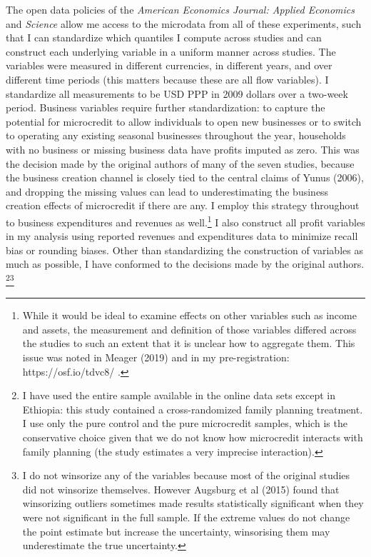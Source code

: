 \documentclass[english,12pt]{article}\usepackage{lmodern}
\numberwithin{equation}{section}
\begin{document}

The open data policies of the \emph{American Economics Journal: Applied Economics} and \emph{Science} allow me access to the microdata from all of these experiments, such that I can standardize which quantiles I compute across studies and can construct each underlying variable in a uniform manner across studies. The variables were measured in different currencies, in different years, and over different time periods (this matters because these are all flow variables). I standardize all measurements to be USD PPP in 2009 dollars over a two-week period. Business variables require further standardization: to capture the potential for microcredit to allow individuals to open new businesses or to switch to operating any existing seasonal businesses throughout the year, households with no business or missing business data have profits imputed as zero. This was the decision made by the original authors of many of the seven studies, because the business creation channel is closely tied to the central claims of Yunus (2006), and dropping the missing values can lead to underestimating the business creation effects of microcredit if there are any. I employ this strategy throughout to business expenditures and revenues as well.\footnote{While it would be ideal to examine effects on other variables such as income and assets, the measurement and definition of those variables differed across the studies to such an extent that it is unclear how to aggregate them. This issue was noted in Meager (2019) and in my pre-registration: https://osf.io/tdvc8/ .} I also construct all profit variables in my analysis using reported revenues and expenditures data to minimize recall bias or rounding biases. Other than standardizing the construction of variables as much as possible, I have conformed to the decisions made by the original authors. \footnote{I have used the entire sample available in the online data sets except in Ethiopia: this study contained a cross-randomized family planning treatment. I use only the pure control and the pure microcredit samples, which is the conservative choice given that we do not know how microcredit interacts with family planning (the study estimates a very imprecise interaction).}\footnote{I do not winsorize any of the variables because most of the original studies did not winsorize themselves. However Augsburg et al (2015) found that winsorizing outliers sometimes made results statistically significant when they were not significant in the full sample. If the extreme values do not change the point estimate but increase the uncertainty, winsorising them may underestimate the true uncertainty.}
\end{document}
